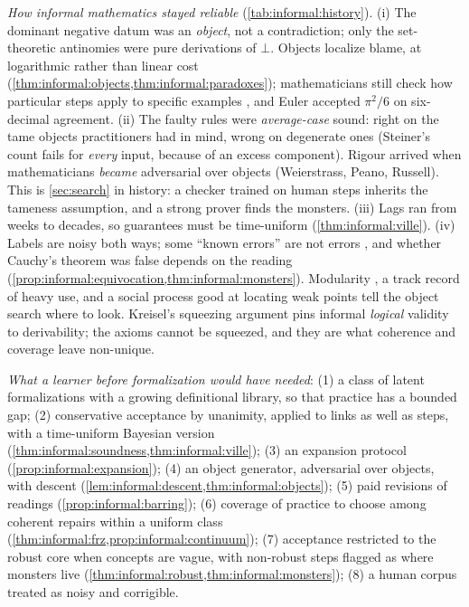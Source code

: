 \emph{How informal mathematics stayed reliable} (\cref{tab:informal:history}). (i) The dominant negative datum was an \emph{object}, not a contradiction; only the set-theoretic antinomies were pure derivations of $\bot$. Objects localize blame, at logarithmic rather than linear cost (\cref{thm:informal:objects,thm:informal:paradoxes}); mathematicians still check how particular steps apply to specific examples \citep{weber2011why}, and Euler accepted $\pi^2/6$ on six-decimal agreement. (ii) The faulty rules were \emph{average-case} sound: right on the tame objects practitioners had in mind, wrong on degenerate ones (Steiner's count fails for \emph{every} input, because of an excess component). Rigour arrived when mathematicians \emph{became} adversarial over objects (Weierstrass, Peano, Russell). This is \cref{sec:search} in history: a checker trained on human steps inherits the tameness assumption, and a strong prover finds the monsters. (iii) Lags ran from weeks to decades, so guarantees must be time-uniform (\cref{thm:informal:ville}). (iv) Labels are noisy both ways; some ``known errors'' are not errors \citep{hales2007jordan}, and whether Cauchy's theorem was false depends on the reading (\cref{prop:informal:equivocation,thm:informal:monsters}). Modularity \citep{avigad2021reliability}, a track record of heavy use, and a social process good at locating weak points \citep{thurston1994proof} tell the object search where to look. Kreisel's squeezing argument \citep{kreisel1967informal} pins informal \emph{logical} validity to derivability; the axioms cannot be squeezed, and they are what coherence and coverage leave non-unique.

\emph{What a learner before formalization would have needed}: (1) a class of latent formalizations with a growing definitional library, so that practice has a bounded gap; (2) conservative acceptance by unanimity, applied to links as well as steps, with a time-uniform Bayesian version (\cref{thm:informal:soundness,thm:informal:ville}); (3) an expansion protocol (\cref{prop:informal:expansion}); (4) an object generator, adversarial over objects, with descent (\cref{lem:informal:descent,thm:informal:objects}); (5) paid revisions of readings (\cref{prop:informal:barring}); (6) coverage of practice to choose among coherent repairs within a uniform class (\cref{thm:informal:frz,prop:informal:continuum}); (7) acceptance restricted to the robust core when concepts are vague, with non-robust steps flagged as where monsters live (\cref{thm:informal:robust,thm:informal:monsters}); (8) a human corpus treated as noisy and corrigible.

